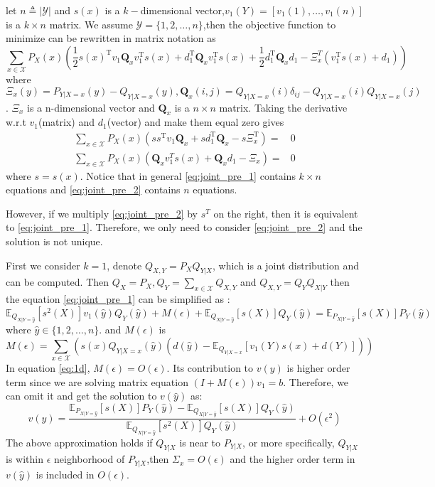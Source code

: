 \documentclass{article}
\def\T{\mathrm{T}}
\def\E{\mathbb{E}}
\begin{document}
let $n\triangleq |\mathcal{Y}|$ and $s(x)$ is a $k-$dimensional vector,$v_1(Y)=[v_1(1),\dots,v_1(n)]$ is a $k\times n$ matrix.
We assume $\mathcal{Y}=\{1,2,\dots,n\}$,then the objective function to minimize can be rewritten in matrix notation as
\begin{equation}\label{eq:min}
\sum_{x\in \mathcal{X}} P_X(x)\left(\frac{1}{2}s(x)^\T v_1 \bm{Q}_x v_1^\T s(x) +d_1^\T \bm{Q}_x v_1^\T s(x)+\frac{1}{2}d_1^\T \bm{Q}_x d_1-\Xi_x^T (v_1^\T s(x)+d_1)\right)
\end{equation}
where $\Xi_x(y)=P_{Y|X=x}(y)-Q_{Y|X=x}(y),\bm{Q}_x(i,j)=Q_{Y|X=x}(i)\delta_{ij}-Q_{Y|X=x}(i)Q_{Y|X=x}(j)$.
$\Xi_x$ is a n-dimensional vector and $\bm{Q}_x$ is a $n\times n$ matrix.
Taking the derivative w.r.t $v_1$(matrix) and $d_1$(vector) and make them equal zero gives
\begin{align}
\sum_{x\in \mathcal{X}} P_X(x)\left(ss^\T v_1 \bm{Q}_x+sd_1^\T \bm{Q}_x-s\Xi_x^\T\right) = & 0 \label{eq:joint_pre_1}\\
\sum_{x\in \mathcal{X}} P_X(x)\left(\bm{Q}_x v_1^Ts(x)+ \bm{Q}_x d_1-\Xi_x\right)=& 0\label{eq:joint_pre_2}
\end{align}
where $s=s(x)$.
Notice that in general \eqref{eq:joint_pre_1} contains $k\times n$ equations and \eqref{eq:joint_pre_2} contains $n$ equations.

However, if we multiply \eqref{eq:joint_pre_2} by $s^T$ on the right, then it is equivalent to \eqref{eq:joint_pre_1}. Therefore, we only need to consider
\eqref{eq:joint_pre_2} and the solution is not unique.


First we consider $k=1$, denote $Q_{X,Y}=P_X Q_{Y|X}$, which is a joint distribution and can be computed.
Then $Q_{X}=P_X,Q_{Y}=\sum_{x\in \mathcal{X}}Q_{X,Y}$ and $Q_{X,Y}=Q_Y Q_{X|Y}$
 then the equation \eqref{eq:joint_pre_1} can be simplified as :
\begin{equation}\label{eq:1d}
\E_{Q_{X|Y=\hat{y}}}[s^2(X)]v_1(\hat{y})Q_Y(\hat{y})+M(\epsilon)+\E_{Q_{X|Y=\hat{y}}}[s(X)]Q_Y(\hat{y})= \E_{P_{X|Y=\hat{y}}}[s(X)]P_Y(\hat{y})
\end{equation}
where $\hat{y}\in \{1,2,\dots,n\}$. and $M(\epsilon)$ is
$$
M(\epsilon)=\sum_{x\in \mathcal{X}}\left(s(x)Q_{Y|X=x}(\hat{y})(d(\hat{y})-\E_{Q_{Y|X=x}}[v_1(Y)s(x)+d(Y)])\right)
$$
In equation \eqref{eq:1d}, $M(\epsilon)=O(\epsilon)$. Its contribution to $v(y)$ is higher order term since 
we are solving matrix equation $(I+M(\epsilon))v_1=b$. Therefore, we can omit it and get the solution to $v(\hat{y})$ as:
\begin{equation}\label{eq:1dv1sol}
v(\hat{y})=\frac{\E_{P_{X|Y=\hat{y}}}[s(X)]P_Y(\hat{y})-\E_{Q_{X|Y=\hat{y}}}[s(X)]Q_Y(\hat{y})}{\E_{Q_{X|Y=\hat{y}}}[s^2(X)]Q_Y(\hat{y})}+O(\epsilon^2)
\end{equation}
The above approximation holds if $Q_{Y|X}$ is near to $P_{Y|X}$, or more specifically, $Q_{Y|X}$ is within $\epsilon$ neighborhood of $P_{Y|X}$,then $\Sigma_{x}=O(\epsilon)$ and the higher order term in $v(\hat{y})$ is included in $O(\epsilon)$.
\end{document}
